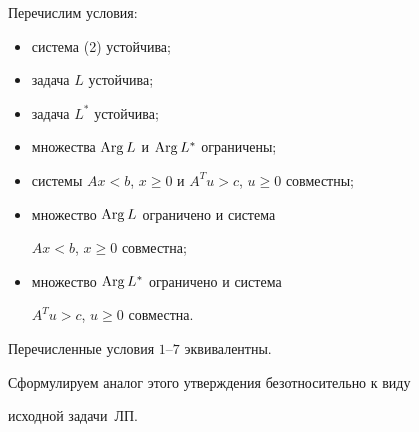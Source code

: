 Перечислим условия:


\begin{itemize}


\item[1.] система (2) устойчива;


\item[2.] задача $L$ устойчива;


\item[3.] задача $L^*$ устойчива;


\item[4.] множества $\operatorname{Arg} L$ и $\operatorname{Arg} L^*$ ограничены;


\item[5.] системы $Ax<b$, $x\geq 0$ и $A^Tu>c$, $u\geq 0$ совместны;


\item[6.] множество $\operatorname{Arg} L$ ограничено и система


$Ax<b$, $x\geq 0$ совместна;


\item[7.] множество $\operatorname{Arg} L^*$ ограничено и система


$A^Tu>c$, $u\geq 0$ совместна.


\end{itemize}





\begin{thm}


Перечисленные условия $1$--$7$ эквивалентны.


\end{thm}





Сформулируем аналог этого утверждения безотносительно к виду


исходной задачи~ЛП.





